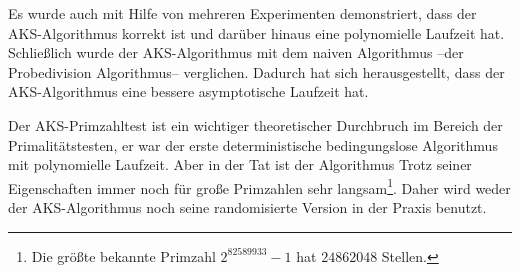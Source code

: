 \documentclass[12pt,oneside]{article}
\theoremstyle{remark}
\theoremstyle{definition}
\begin{document}
Es wurde auch mit Hilfe von mehreren Experimenten demonstriert, dass der AKS-Algorithmus korrekt ist und darüber hinaus eine polynomielle Laufzeit hat. Schließlich wurde der AKS-Algorithmus mit dem naiven Algorithmus --der Probedivision Algorithmus-- verglichen. Dadurch hat sich herausgestellt, dass der AKS-Algorithmus eine bessere asymptotische Laufzeit hat.

Der AKS-Primzahltest ist ein wichtiger theoretischer Durchbruch im Bereich der Primalitätstesten, er war der erste deterministische bedingungslose Algorithmus mit polynomielle Laufzeit. Aber in der Tat ist der Algorithmus Trotz seiner Eigenschaften immer noch für große Primzahlen sehr langsam\footnote{Die größte bekannte Primzahl $2^{82589933} - 1$ hat $24862048$ Stellen.}. Daher wird weder der AKS-Algorithmus noch seine randomisierte Version in der Praxis benutzt\cite{mit_aks}.



 


\clearpage
\lhead{}
\printbibliography
{}


\clearpage
\appendix
\end{document}
